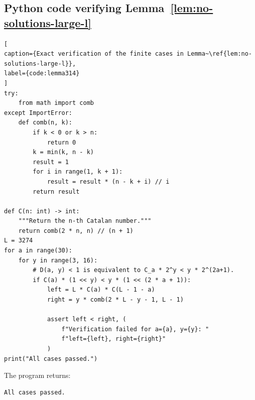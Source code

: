 \documentclass[11pt]{article}
\begin{document}
\subsection{Python code verifying Lemma~\ref{lem:no-solutions-large-l}}\label{app:code}
	\begin{lstlisting}[
caption={Exact verification of the finite cases in Lemma~\ref{lem:no-solutions-large-l}},
label={code:lemma314}
]
try:
    from math import comb
except ImportError:
    def comb(n, k):
        if k < 0 or k > n:
            return 0
        k = min(k, n - k)
        result = 1
        for i in range(1, k + 1):
            result = result * (n - k + i) // i
        return result

def C(n: int) -> int:
    """Return the n-th Catalan number."""
    return comb(2 * n, n) // (n + 1)
L = 3274
for a in range(30):          
    for y in range(3, 16):  
        # D(a, y) < 1 is equivalent to C_a * 2^y < y * 2^(2a+1).
        if C(a) * (1 << y) < y * (1 << (2 * a + 1)):
            left = L * C(a) * C(L - 1 - a)
            right = y * comb(2 * L - y - 1, L - 1)

            assert left < right, (
                f"Verification failed for a={a}, y={y}: "
                f"left={left}, right={right}"
            )
print("All cases passed.")
\end{lstlisting}
The program returns:
\begin{verbatim}
All cases passed.
\end{verbatim}
\end{document}

